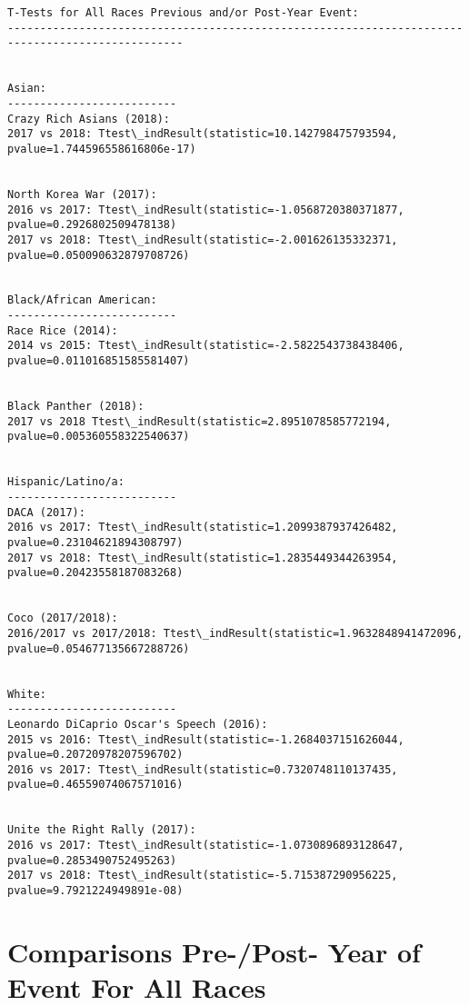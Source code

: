 \documentclass[11pt]{article}
\begin{document}
    \begin{Verbatim}[commandchars=\\\{\}]
T-Tests for All Races Previous and/or Post-Year Event:
-------------------------------------------------------------------------------------------------


Asian:
--------------------------
Crazy Rich Asians (2018):
2017 vs 2018: Ttest\_indResult(statistic=10.142798475793594, pvalue=1.744596558616806e-17)


North Korea War (2017):
2016 vs 2017: Ttest\_indResult(statistic=-1.0568720380371877, pvalue=0.2926802509478138)
2017 vs 2018: Ttest\_indResult(statistic=-2.001626135332371, pvalue=0.050090632879708726)


Black/African American:
--------------------------
Race Rice (2014):
2014 vs 2015: Ttest\_indResult(statistic=-2.5822543738438406, pvalue=0.011016851585581407)


Black Panther (2018):
2017 vs 2018 Ttest\_indResult(statistic=2.8951078585772194, pvalue=0.005360558322540637)


Hispanic/Latino/a:
--------------------------
DACA (2017):
2016 vs 2017: Ttest\_indResult(statistic=1.2099387937426482, pvalue=0.23104621894308797)
2017 vs 2018: Ttest\_indResult(statistic=1.2835449344263954, pvalue=0.20423558187083268)


Coco (2017/2018):
2016/2017 vs 2017/2018: Ttest\_indResult(statistic=1.9632848941472096, pvalue=0.054677135667288726)


White:
--------------------------
Leonardo DiCaprio Oscar's Speech (2016):
2015 vs 2016: Ttest\_indResult(statistic=-1.2684037151626044, pvalue=0.20720978207596702)
2016 vs 2017: Ttest\_indResult(statistic=0.7320748110137435, pvalue=0.46559074067571016)


Unite the Right Rally (2017):
2016 vs 2017: Ttest\_indResult(statistic=-1.0730896893128647, pvalue=0.2853490752495263)
2017 vs 2018: Ttest\_indResult(statistic=-5.715387290956225, pvalue=9.7921224949891e-08)

    \end{Verbatim}

    \section{Comparisons Pre-/Post- Year of Event For All
Races}\label{comparisons-pre-post--year-of-event-for-all-races}
\end{document}
